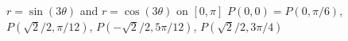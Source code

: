 {$r=\sin(3\theta)$ and $r=\cos(3\theta)$ on $[0,\pi]$}
{$P(0,0)=P(0,\pi/6)$, $P(\sqrt{2}/2,\pi/12)$, $P(-\sqrt{2}/2,5\pi/12)$, $P(\sqrt{2}/2,3\pi/4)$
}
